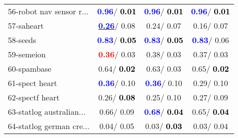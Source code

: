 \begin{table}[h]
\begin{center}
\begin{tabular}{lc|c|c}
56-robot nav sensor r... & \textcolor{blue}{\textbf{  0.96}}/\textcolor{black}{\textbf{  0.01}} & \textcolor{blue}{\textbf{  0.96}}/\textcolor{black}{\textbf{  0.01}} & \textcolor{blue}{\textbf{  0.96}}/\textcolor{black}{\textbf{  0.01}} \\
57-saheart & \underline{\textcolor{blue}{\textbf{  0.26}}}/  0.08 &   0.24/  0.07 &   0.16/  0.07 \\
58-seeds & \textcolor{blue}{\textbf{  0.83}}/\textcolor{black}{\textbf{  0.05}} & \textcolor{blue}{\textbf{  0.83}}/\textcolor{black}{\textbf{  0.05}} & \textcolor{blue}{\textbf{  0.83}}/  0.06 \\
59-semeion & \textcolor{red}{\textbf{  0.36}}/  0.03 &   0.38/  0.03 &   0.37/  0.03 \\
60-spambase &   0.64/\textcolor{black}{\textbf{  0.02}} &   0.63/  0.03 &   0.65/\textcolor{black}{\textbf{  0.02}} \\ \hline
61-spect heart & \textcolor{blue}{\textbf{  0.36}}/  0.10 & \textcolor{blue}{\textbf{  0.36}}/  0.10 &   0.29/  0.10 \\
62-spectf heart &   0.26/\textcolor{black}{\textbf{  0.08}} &   0.25/  0.10 &   0.27/  0.09 \\
63-statlog australian... &   0.66/  0.09 & \textcolor{blue}{\textbf{  0.68}}/\textcolor{black}{\textbf{  0.04}} &   0.65/\textcolor{black}{\textbf{  0.04}} \\
64-statlog german cre... &   0.04/  0.05 &   0.03/\textcolor{black}{\textbf{  0.03}} &   0.03/  0.04 \\\end{tabular}\label{stratsALCKappa1bNBRedux}
\end{center}
\end{table}
